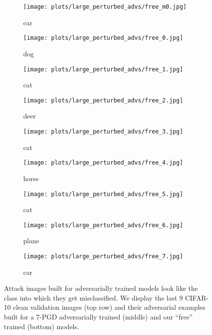 \documentclass{article}
\begin{document}
\begin{figure}[t]
    \begin{subfigure}{0.8\linewidth}
    \centering
    \begin{minipage}[b]{0.10\linewidth}
        \texttt{[image: plots/large\_perturbed\_advs/free\_m0.jpg]}\vspace{-2mm}\caption{car}
    \end{minipage}
    \begin{minipage}[b]{0.10\linewidth}
        \texttt{[image: plots/large\_perturbed\_advs/free\_0.jpg]}\vspace{-2mm}\caption{dog}
    \end{minipage}
    \begin{minipage}[b]{0.10\linewidth}
        \texttt{[image: plots/large\_perturbed\_advs/free\_1.jpg]}\vspace{-2mm}\caption{cat}
    \end{minipage}
        \begin{minipage}[b]{0.10\linewidth}
        \texttt{[image: plots/large\_perturbed\_advs/free\_2.jpg]}\vspace{-2mm}\caption{deer}
    \end{minipage}
        \begin{minipage}[b]{0.10\linewidth}
        \texttt{[image: plots/large\_perturbed\_advs/free\_3.jpg]}\vspace{-2mm}\caption{cat}
    \end{minipage}
        \begin{minipage}[b]{0.10\linewidth}
        \texttt{[image: plots/large\_perturbed\_advs/free\_4.jpg]}\vspace{-2mm}\caption{horse}
    \end{minipage}
        \begin{minipage}[b]{0.10\linewidth}
        \texttt{[image: plots/large\_perturbed\_advs/free\_5.jpg]}\vspace{-2mm}\caption{cat}
    \end{minipage}
        \begin{minipage}[b]{0.10\linewidth}
        \texttt{[image: plots/large\_perturbed\_advs/free\_6.jpg]}\vspace{-2mm}\caption{plane}
    \end{minipage}
        \begin{minipage}[b]{0.10\linewidth}
        \texttt{[image: plots/large\_perturbed\_advs/free\_7.jpg]}\vspace{-2mm}\caption{car}
    \end{minipage}
    \end{subfigure}
    \caption{
    Attack images built for adversarially trained models look like the class into which they get misclassified. We display the last 9 CIFAR-10 clean validation images (top row) and their adversarial examples built for a 7-PGD adversarially trained (middle) and our ``free'' trained (bottom) models.}
    \label{fig:viz_eps30}
\end{figure}
\captionsetup[subfigure]{labelformat=parens}
\end{document}
